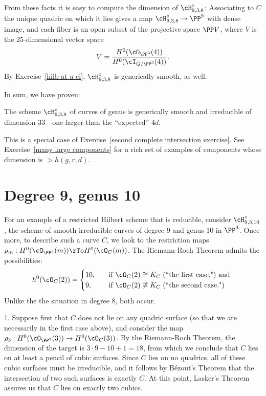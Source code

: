 From these facts it is easy to compute the dimension of  $\cH^\circ_{9,3,8}$: Associating to $C$ the unique quadric on which it lies gives a map $\cH^\circ_{9,3,8} \to \PP^9$ with dense image, and each fiber is an open subset of the projective space $\PP V$, where $V$ is the 25-dimensional vector space
$$
V = \frac{H^0(\cO_{\PP^3}(4))}{H^0(\cI_{Q/\PP^3}(4))}.
$$
By Exercise~\ref{hilb at a ci}, $\cH^\circ_{9,3,8}$ is generically smooth, as well.

In sum, we have proven:
\begin{proposition}
 The scheme $\cH^\circ_{9,3,8}$ of curves of genus  is generically smooth and irreducible of dimension 33---one larger than the ``expected'' $4d$.
\end{proposition}
This is a special case of Exercise~\ref{second complete intersection exercise}.
See Exercise~\ref{many large components} for a rich set of examples of components whose dimension
is $>h(g,r,d)$.


\section{Degree 9, genus 10}\label{deg9 section}

For an example of a restricted Hilbert scheme that is reducible, consider $\cH^\circ_{9,3,10}$, the
scheme of smooth irreducible curves of degree 9 and genus 10 in $\PP^{3}$. Once more, to describe such a curve $C$, we look to the restriction maps $\rho_m: H^0(\cO_{\PP^3}(m)) \rTo H^0(\cO_C(m))$. The Riemann-Roch Theorem admits the possibilities:
\begin{align*}
h^0(\cO_C(2)) =
\begin{cases}
10, \quad &\text{if } \cO_C(2) \cong K_C \; \text{(``the first case,") and } \\
9,  \quad &\text{if } \cO_C(2) \not\cong K_C  \; \text{(``the second case.")}
\end{cases}
\end{align*}
Unlike the the situation in degree 8, both occur.

1. Suppose first that $C$ does not lie on any quadric surface (so that we are necessarily in the first case above), and consider the map $\rho_3 : H^0(\cO_{\PP^3}(3)) \to H^0(\cO_C(3))$. By the Riemann-Roch Theorem, the dimension of the target is $3\cdot 9 - 10 + 1 = 18$, from which we conclude that $C$ lies on at least a pencil of cubic surfaces. Since $C$ lies on no quadrics, all of these cubic surfaces must be irreducible, and it follows by B\'ezout's Theorem that the intersection of two such surfaces is exactly $C$. At this point, Lasker's Theorem assures us that $C$ lies on exactly two cubics.

